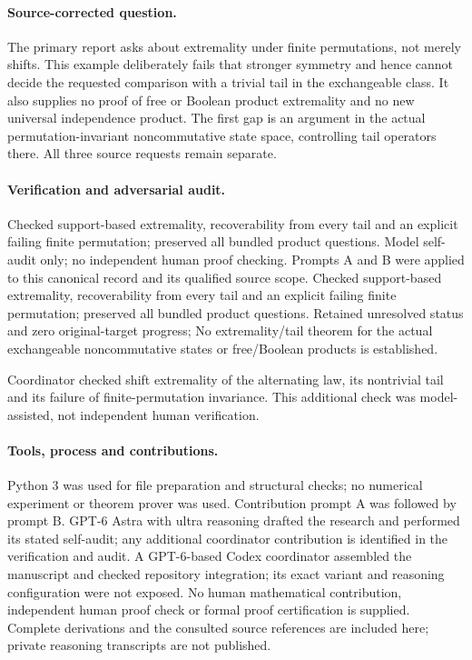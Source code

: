 \documentclass[11pt]{article}
\begin{document}
\paragraph{Source-corrected question.} The primary report asks about extremality under finite permutations, not merely shifts. This example deliberately fails that stronger symmetry and hence cannot decide the requested comparison with a trivial tail in the exchangeable class. It also supplies no proof of free or Boolean product extremality and no new universal independence product. The first gap is an argument in the actual permutation-invariant noncommutative state space, controlling tail operators there. All three source requests remain separate.

\paragraph{Verification and adversarial audit.}
Checked support-based extremality, recoverability from every tail and an explicit failing finite permutation; preserved all bundled product questions. Model self-audit only; no independent human proof checking. Prompts A and B were applied to this canonical record and its qualified source scope. Checked support-based extremality, recoverability from every tail and an explicit failing finite permutation; preserved all bundled product questions. Retained unresolved status and zero original-target progress; No extremality/tail theorem for the actual exchangeable noncommutative states or free/Boolean products is established.

Coordinator checked shift extremality of the alternating law, its nontrivial tail and its failure of finite-permutation invariance. This additional check was model-assisted, not independent human verification.

\paragraph{Tools, process and contributions.}
Python 3 was used for file preparation and structural checks; no numerical experiment or theorem prover was used. Contribution prompt A was followed by prompt B. GPT-6 Astra with ultra reasoning drafted the research and performed its stated self-audit; any additional coordinator contribution is identified in the verification and audit. A GPT-6-based Codex coordinator assembled the manuscript and checked repository integration; its exact variant and reasoning configuration were not exposed. No human mathematical contribution, independent human proof check or formal proof certification is supplied. Complete derivations and the consulted source references are included here; private reasoning transcripts are not published.
\end{document}

